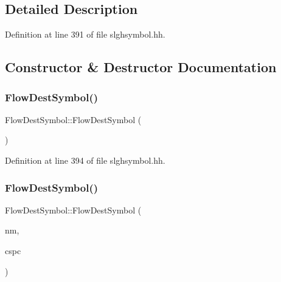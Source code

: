 \subsection{Detailed Description}


Definition at line 391 of file slghsymbol.\+hh.



\subsection{Constructor \& Destructor Documentation}
\mbox{\label{class_flow_dest_symbol_ab3f23c5cbfb5adbf08c75f3db2c096bc}} 
\subsubsection{\texorpdfstring{FlowDestSymbol()}{FlowDestSymbol()}\hspace{0.1cm}{\footnotesize\ttfamily [1/2]}}
{\footnotesize\ttfamily Flow\+Dest\+Symbol\+::\+Flow\+Dest\+Symbol (\begin{DoxyParamCaption}\item[{void}]{ }\end{DoxyParamCaption})\hspace{0.3cm}{\ttfamily [inline]}}



Definition at line 394 of file slghsymbol.\+hh.

\mbox{\label{class_flow_dest_symbol_a95ad20cff6f52ccfbef3b2ff97734e02}} 
\subsubsection{\texorpdfstring{FlowDestSymbol()}{FlowDestSymbol()}\hspace{0.1cm}{\footnotesize\ttfamily [2/2]}}
{\footnotesize\ttfamily Flow\+Dest\+Symbol\+::\+Flow\+Dest\+Symbol (\begin{DoxyParamCaption}\item[{const string \&}]{nm,  }\item[{\mbox{\hyperlink{class_addr_space}{Addr\+Space}} $\ast$}]{cspc }\end{DoxyParamCaption})}



